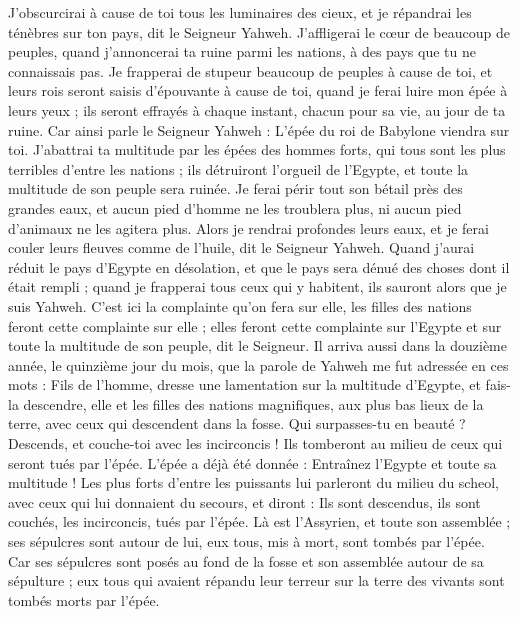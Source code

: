 \begin{multicols}{2}
J’obscurcirai à cause de toi tous les luminaires des cieux, et je répandrai les ténèbres sur ton pays, dit le Seigneur Yahweh.
J’affligerai le cœur de beaucoup de peuples, quand j’annoncerai ta ruine parmi les nations, à des pays que tu ne connaissais pas.
Je frapperai de stupeur beaucoup de peuples à cause de toi, et leurs rois seront saisis d’épouvante à cause de toi, quand je ferai luire mon épée à leurs yeux ; ils seront effrayés à chaque instant, chacun pour sa vie, au jour de ta ruine.
Car ainsi parle le Seigneur Yahweh : L'épée du roi de Babylone viendra sur toi.
J'abattrai ta multitude par les épées des hommes forts, qui tous sont les plus terribles d'entre les nations ; ils détruiront l'orgueil de l'Egypte, et toute la multitude de son peuple sera ruinée.
Je ferai périr tout son bétail près des grandes eaux, et aucun pied d'homme ne les troublera plus, ni aucun pied d’animaux ne les agitera plus.
Alors je rendrai profondes leurs eaux, et je ferai couler leurs fleuves comme de l'huile, dit le Seigneur Yahweh.
Quand j'aurai réduit le pays d'Egypte en désolation, et que le pays sera dénué des choses dont il était rempli ; quand je frapperai tous ceux qui y habitent, ils sauront alors que je suis Yahweh.
C'est ici la complainte qu'on fera sur elle, les filles des nations feront cette complainte sur elle ; elles feront cette complainte sur l'Egypte et sur toute la multitude de son peuple, dit le Seigneur.
Il arriva aussi dans la douzième année, le quinzième jour du mois, que la parole de Yahweh me fut adressée en ces mots :
Fils de l’homme, dresse une lamentation sur la multitude d'Egypte, et fais-la descendre, elle et les filles des nations magnifiques, aux plus bas lieux de la terre, avec ceux qui descendent dans la fosse.
Qui surpasses-tu en beauté ? Descends, et couche-toi avec les incirconcis !
Ils tomberont au milieu de ceux qui seront tués par l'épée. L'épée a déjà été donnée : Entraînez l’Egypte et toute sa multitude !
Les plus forts d'entre les puissants lui parleront du milieu du scheol, avec ceux qui lui donnaient du secours, et diront : Ils sont descendus, ils sont couchés, les incirconcis, tués par l'épée.
Là est l'Assyrien, et toute son assemblée ; ses sépulcres sont autour de lui, eux tous, mis à mort, sont tombés par l'épée.
Car ses sépulcres sont posés au fond de la fosse et son assemblée autour de sa sépulture ; eux tous qui avaient répandu leur terreur sur la terre des vivants sont tombés morts par l'épée.

\end{multicols}

